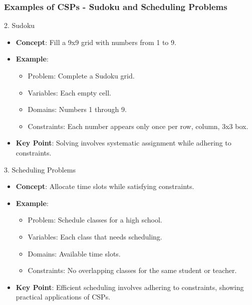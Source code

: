 \documentclass[aspectratio=169]{beamer}
\begin{document}
\begin{frame}[fragile]
    \frametitle{Examples of CSPs - Sudoku and Scheduling Problems}
    \begin{block}{2. Sudoku}
        \begin{itemize}
            \item \textbf{Concept}: Fill a 9x9 grid with numbers from 1 to 9.
            \item \textbf{Example}:
            \begin{itemize}
                \item Problem: Complete a Sudoku grid.
                \item Variables: Each empty cell.
                \item Domains: Numbers 1 through 9.
                \item Constraints: Each number appears only once per row, column, 3x3 box.
            \end{itemize}
            \item \textbf{Key Point}: Solving involves systematic assignment while adhering to constraints.
        \end{itemize}
    \end{block}

    \begin{block}{3. Scheduling Problems}
        \begin{itemize}
            \item \textbf{Concept}: Allocate time slots while satisfying constraints.
            \item \textbf{Example}:
            \begin{itemize}
                \item Problem: Schedule classes for a high school.
                \item Variables: Each class that needs scheduling.
                \item Domains: Available time slots.
                \item Constraints: No overlapping classes for the same student or teacher.
            \end{itemize}
            \item \textbf{Key Point}: Efficient scheduling involves adhering to constraints, showing practical applications of CSPs.
        \end{itemize}
    \end{block}
\end{frame}
\end{document}
